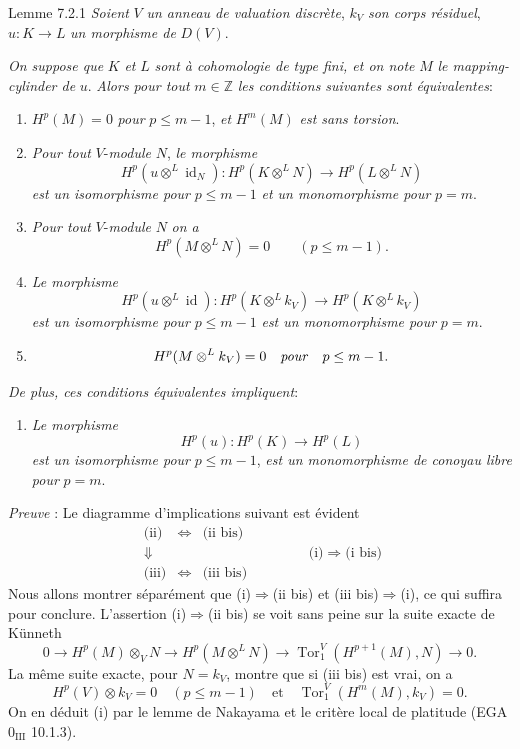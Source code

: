 \begin{statement}{Lemme 7.2.1}
\emph{Soient} $V$ \emph{un anneau de valuation discrète}, $k_V$ \emph{son corps résiduel}, $u:K\to L$ \emph{un morphisme de} $D(V)$.

\emph{On suppose que} $K$ \emph{et} $L$ \emph{sont à cohomologie de type fini, et on note} $M$ \emph{le mapping-cylinder de} $u$. \emph{Alors pour tout} $m\in\mathbb{Z}$ \emph{les conditions suivantes sont équivalentes}:
\begin{enumerate}[label=(\roman*)]
\item $H^p(M)=0$ \emph{pour} $p\le m-1$, \emph{et} $H^m(M)$ \emph{est sans torsion}.
\item
\emph{Pour tout} $V$-\emph{module} $N$, \emph{le morphisme}
\[
H^p(u\otimes^L\operatorname{id}_N):H^p(K\otimes^L N)\to H^p(L\otimes^L N)
\]
\emph{est un isomorphisme pour} $p\le m-1$ \emph{et un monomorphisme pour} $p=m$.
\item[(ii bis)] \emph{Pour tout} $V$-\emph{module} $N$ \emph{on a}
\[
H^p(M\otimes^L N)=0\qquad(p\le m-1).
\]
\item \emph{Le morphisme}
\[
H^p(u\otimes^L\operatorname{id}):H^p(K\otimes^L k_V)\to H^p(K\otimes^L k_V)
\]
\emph{est un isomorphisme pour} $p\le m-1$ \emph{est un monomorphisme pour} $p=m$.
\item[(iii bis)]
\[
H^p(M\otimes^L k_V)=0\quad\text{\emph{pour}}\quad p\le m-1.
\]
\end{enumerate}
\emph{De plus, ces conditions équivalentes impliquent}:
\begin{enumerate}[label=(\roman* bis)]
\item \emph{Le morphisme}
\[
H^p(u):H^p(K)\to H^p(L)
\]
\emph{est un isomorphisme pour} $p\le m-1$, \emph{est un monomorphisme de conoyau libre pour} $p=m$.
\end{enumerate}
\end{statement}

\emph{Preuve} : Le diagramme d'implications suivant est évident
\[
\begin{array}{ccc}
\text{(ii)}&\Leftrightarrow&\text{(ii bis)}\\
\Downarrow&&\\
\text{(iii)}&\Leftrightarrow&\text{(iii bis)}
\end{array}
\qquad\qquad
\text{(i)}\Rightarrow\text{(i bis)}
\]
Nous allons montrer séparément que (i)$\Rightarrow$(ii bis) et (iii bis)$\Rightarrow$(i), ce qui suffira pour conclure. L'assertion (i)$\Rightarrow$(ii bis) se voit sans peine sur la suite exacte de Künneth
\[
0\to H^p(M)\otimes_V N\to H^p(M\otimes^L N)\to \operatorname{Tor}_1^V(H^{p+1}(M),N)\to0.
\]
La même suite exacte, pour $N=k_V$, montre que si (iii bis) est vrai, on a
\[
H^p(V)\otimes k_V=0\quad(p\le m-1)\quad\text{et}\quad
\operatorname{Tor}_1^V(H^m(M),k_V)=0.
\]
On en
déduit (i) par le lemme de Nakayama et le critère local de platitude (EGA $0_{\mathrm{III}}$ 10.1.3).

